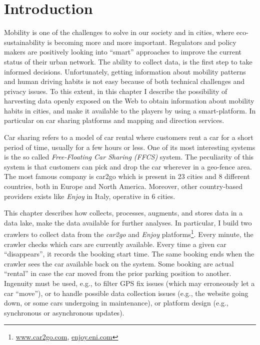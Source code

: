 \section{Introduction}
\label{sec:2_1_intro}

Mobility is one of the challenges to solve in our society and in cities, where eco-sustainability is becoming more and more important. Regulators and policy makers are positively looking into ``smart'' approaches to improve the current status of their urban network.  The ability to collect data, is the first step to take informed decisions. Unfortunately, getting information about mobility patterns and human driving habits is not easy because of both technical challenges and privacy issues.
%
To this extent, in this chapter I describe the possibility of harvesting data openly exposed on the Web to obtain information about mobility habits in cities, and make it available to the players by using a smart-platform. In particular on car sharing platforms and mapping and direction services.

Car sharing refers to a model of car rental where customers rent a car for a short period of time, usually for a few hours or less. One of its most interesting systems is the so called \textit{Free-Floating Car Sharing (FFCS)} system. The peculiarity of this system is that customers can pick and drop the car wherever in a geo-fence area. The most famous company is car2go which is present in 23 cities and 8 different countries, both in Europe and North America. Moreover, other country-based providers exists like \textit{Enjoy} in Italy, operative in 6 cities.

This chapter describes how \tool collects, processes, augments, and stores data in a data lake, make the data available for further analyses. In particular, I build two crawlers to collect data from the \textit{car2go} and \textit{Enjoy} platforms\footnote{\url{www.car2go.com}, \url{enjoy.eni.com}}. Every minute, the crawler checks which cars are currently available. Every time a given car ``disappears'', it records the booking start time. The same booking ends when the crawler sees the car available back on the system. Some booking are actual ``rental'' in case the car moved from the prior parking position to another. Ingenuity must be used, e.g., to filter GPS fix issues (which may erroneously let a car ``move''), or to handle possible data collection issues (e.g., the website going down, or some cars undergoing in maintenance), or platform design (e.g., synchronous or asynchronous updates).

